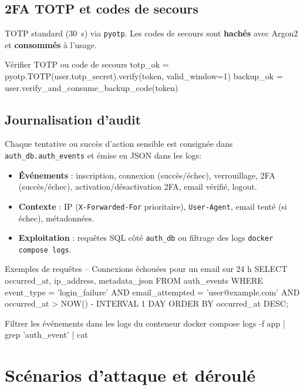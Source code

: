 \subsection*{2FA TOTP et codes de secours}
\noindent TOTP standard (30~s) via \texttt{pyotp}. Les codes de secours sont \textbf{hachés} avec Argon2 et \textbf{consommés} à l'usage.
\begin{codebox}[language=Python]{Vérifier TOTP ou code de secours}
totp_ok = pyotp.TOTP(user.totp_secret).verify(token, valid_window=1)
backup_ok = user.verify_and_consume_backup_code(token)
\end{codebox}

\subsection*{Journalisation d'audit}
\noindent Chaque tentative ou succès d'action sensible est consignée dans \texttt{auth\_db.auth\_events} et émise en JSON dans les logs:\
\begin{itemize}
  \item \textbf{Événements} : inscription, connexion (succès/échec), verrouillage, 2FA (succès/échec), activation/désactivation 2FA, email vérifié, logout.
  \item \textbf{Contexte} : IP (\texttt{X-Forwarded-For} prioritaire), \texttt{User-Agent}, email tenté (si échec), métadonnées.
  \item \textbf{Exploitation} : requêtes SQL côté \texttt{auth\_db} ou filtrage des logs \texttt{docker compose logs}.
\end{itemize}

\begin{codebox}[language=SQL]{Exemples de requêtes}
-- Connexions échouées pour un email sur 24 h
SELECT occurred_at, ip_address, metadata_json
FROM auth_events
WHERE event_type = 'login_failure'
  AND email_attempted = 'user@example.com'
  AND occurred_at > NOW() - INTERVAL 1 DAY
ORDER BY occurred_at DESC;
\end{codebox}

\begin{codebox}[language=bash]{Filtrer les événements dans les logs du conteneur}
docker compose logs -f app | grep 'auth_event' | cat
\end{codebox}

\section{Scénarios d'attaque et déroulé}


